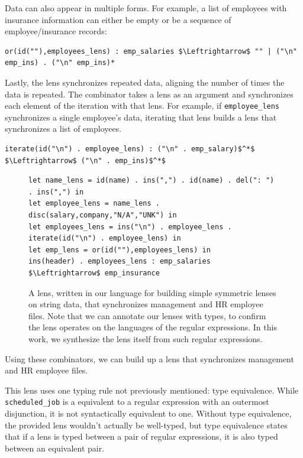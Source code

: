 \documentclass[acmsmall,screen,anonymous]{acmart}
\begin{document}
Data can also appear in multiple forms. For example,
a list of employees with insurance information can either be empty or
be a sequence of employee/insurance records: 
%
\begin{lstlisting}
or(id(""),employees_lens) : emp_salaries $\Leftrightarrow$ "" | ("\n" emp_ins) . ("\n" emp_ins)*
\end{lstlisting}


Lastly, the \IterateLens lens synchronizes repeated data, aligning the number of
times the data is repeated. The \IterateLens combinator takes a lens as an
argument and synchronizes each element of the iteration with that lens. For
example, if \lstinline{employee_lens} synchronizes a single employee's data,
iterating that lens builds a lens that synchronizes a list of employees.
%
\begin{lstlisting}
iterate(id("\n") . employee_lens) : ("\n" . emp_salary)$^*$ $\Leftrightarrow$ ("\n" . emp_ins)$^*$
\end{lstlisting}
%

\begin{figure}
\begin{lstlisting}
let name_lens = id(name) . ins(",") . id(name) . del(": ") . ins(",") in
let employee_lens = name_lens . disc(salary,company,"N/A","UNK") in
let employees_lens = ins("\n") . employee_lens . iterate(id("\n") . employee_lens) in
let emp_lens = or(id(""),employees_lens) in
ins(header) . employees_lens : emp_salaries $\Leftrightarrow$ emp_insurance
\end{lstlisting}
  \caption{A lens, written in our language for building simple symmetric lenses
    on string data, that synchronizes management and HR employee files.
    Note that we can annotate our lenses with types, to confirm the lens
    operates on the languages of the regular expressions. In this work, we
    synthesize the lens itself from such regular expressions.}
  \label{fig:example_lens}
\end{figure}

Using these combinators, we can build up a lens that synchronizes
management and HR employee files. 

This lens uses one typing rule not previously
mentioned: type equivalence. While \lstinline{scheduled_job} is a equivalent to
a regular expression with an outermost disjunction, it is not syntactically
equivalent to one. Without type equivalence, the provided lens wouldn't actually
be well-typed, but type equivalence states that if a lens is typed between a
pair of regular expressions, it is also typed between an equivalent pair.
\end{document}
